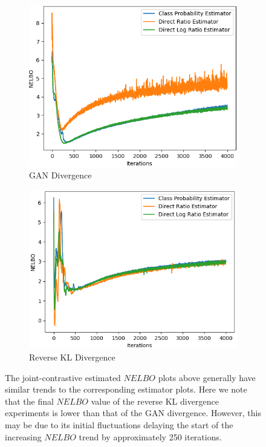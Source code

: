 \documentclass[honours,12pt]{unswthesis}
\numberwithin{equation}{section}
\theoremstyle{definition}
\begin{document}
\begin{figure}[h]
\begin{subfigure}{0.49\textwidth}
\includegraphics[width=\linewidth]{part2nelbos/JCADVvsJCADVexpvsJCADVgudlog.png}
\caption{GAN Divergence}
\end{subfigure}
\begin{subfigure}{0.49\textwidth}
\includegraphics[width=\linewidth]{part2nelbos/JCKLDvsJCKLexpvsJCKLgudlog.png}
\caption{Reverse KL Divergence}
\end{subfigure}
\caption{\small The joint-contrastive estimated $NELBO$ plots above generally have similar trends to the corresponding estimator plots. Here we note that the final $NELBO$ value of the reverse KL divergence experiments is lower than that of the GAN divergence. However, this may be due to its initial fluctuations delaying the start of the increasing $NELBO$ trend by approximately 250 iterations.}
\end{figure}
\newpage
\end{document}
